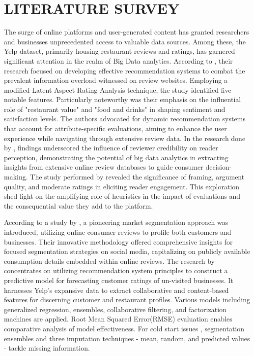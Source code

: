 \documentclass[conference]{IEEEtran}
\begin{document}
\section{LITERATURE SURVEY}
The surge of online platforms and user-generated content has granted researchers and businesses unprecedented access to valuable data sources. Among these, the Yelp dataset, primarily housing restaurant reviews and ratings, has garnered significant attention in the realm of Big Data analytics. According to \cite{b1}, their research focused on developing effective recommendation systems to combat the prevalent information overload witnessed on review websites. Employing a modified Latent Aspect Rating Analysis \cite{latent} technique, the study identified five notable features. Particularly noteworthy was their emphasis on the influential role of "restaurant value" and "food and drinks" in shaping sentiment and satisfaction levels. The authors advocated for dynamic recommendation systems that account for attribute-specific evaluations, aiming to enhance the user experience while navigating through extensive review data.
In the research done by \cite{b2}, findings underscored the influence of reviewer credibility on reader perception, demonstrating the potential of big data analytics in extracting insights from extensive online review databases to guide consumer decision-making.
The study performed by \cite{b3} revealed the significance of framing, argument quality, and moderate ratings in eliciting reader engagement. This exploration shed light on the amplifying role of heuristics in the impact of evaluations and the consequential value they add to the platform.

According to a study by \cite{b4}, a pioneering market segmentation approach was introduced, utilizing online consumer reviews to profile both customers and businesses. Their innovative methodology offered comprehensive insights for focused segmentation strategies on social media, capitalizing on publicly available consumption details embedded within online reviews.
The research by \cite{ramaswamy} concentrates on utilizing recommendation system principles to construct a predictive model for forecasting customer ratings of un-visited businesses. It harnesses Yelp's expansive data to extract collaborative and content-based features for discerning customer and restaurant profiles. Various models including generalized regression, ensembles, collaborative filtering, and factorization machines are applied. Root Mean Squared Error(RMSE) evaluation enables comparative analysis of model effectiveness. For cold start issues \cite{cold_start}, segmentation ensembles and three imputation techniques - mean, random, and predicted values - tackle missing information. 
\end{document}
